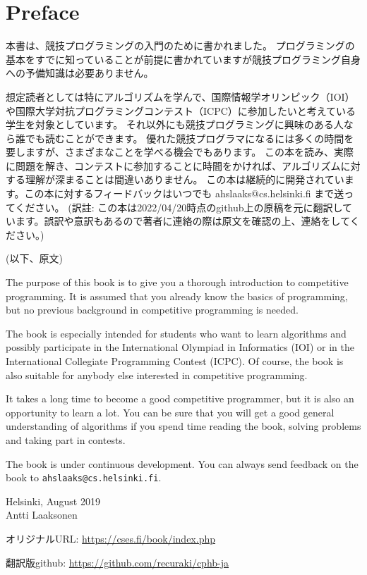 \chapter*{Preface}

本書は、競技プログラミングの入門のために書かれました。
プログラミングの基本をすでに知っていることが前提に書かれていますが競技プログラミング自身への予備知識は必要ありません。

想定読者としては特にアルゴリズムを学んで、国際情報学オリンピック（IOI）や国際大学対抗プログラミングコンテスト（ICPC）に参加したいと考えている学生を対象としています。
それ以外にも競技プログラミングに興味のある人なら誰でも読むことができます。
優れた競技プログラマになるには多くの時間を要しますが、さまざまなことを学べる機会でもあります。
この本を読み、実際に問題を解き、コンテストに参加することに時間をかければ、アルゴリズムに対する理解が深まることは間違いありません。
この本は継続的に開発されています。この本に対するフィードバックはいつでも ahslaaks@cs.helsinki.fi まで送ってください。
(訳註: この本は2022/04/20時点のgithub上の原稿を元に翻訳しています。誤訳や意訳もあるので著者に連絡の際は原文を確認の上、連絡をしてください。)

(以下、原文)

The purpose of this book is to give you
a thorough introduction to competitive programming.
It is assumed that you already
know the basics of programming, but no previous
background in competitive programming is needed.

The book is especially intended for
students who want to learn algorithms and
possibly participate in
the International Olympiad in Informatics (IOI) or
in the International Collegiate Programming Contest (ICPC).
Of course, the book is also suitable for
anybody else interested in competitive programming.

It takes a long time to become a good competitive
programmer, but it is also an opportunity to learn a lot.
You can be sure that you will get
a good general understanding of algorithms
if you spend time reading the book,
solving problems and taking part in contests.

The book is under continuous development.
You can always send feedback on the book to
\texttt{ahslaaks@cs.helsinki.fi}.

\begin{flushright}
Helsinki, August 2019 \\
Antti Laaksonen
\end{flushright}

オリジナルURL: \url{https://cses.fi/book/index.php}

翻訳版github: \url{https://github.com/recuraki/cphb-ja}